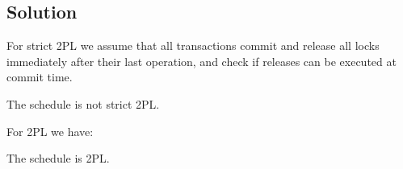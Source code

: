 \documentclass[12pt, a4paper]{report}
\begin{document}
    \subsection*{Solution}
        For strict 2PL we assume that all transactions commit and release all locks immediately after their last operation, and check if releases can be executed at commit time.
        \begin{table}[H]
            \centering
        \end{table}
        The schedule is not strict 2PL.

        For 2PL we have:
        \begin{table}[H]
            \centering
        \end{table}
        The schedule is 2PL. 
\end{document}
